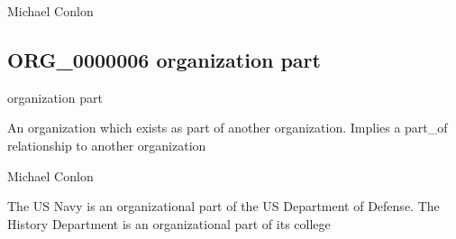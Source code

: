 \documentclass[letterpaper,10pt,english]{sphinxmanual}
\begin{document}
\begin{sphinxShadowBox}

\sphinxAtStartPar
Michael Conlon 
\end{sphinxShadowBox}
\begin{quote}

\ignorespaces \end{quote}


\subsection{ORG\_0000006 \sphinxhyphen{} organization part}
\label{\detokenize{doc-ORG_0000006:org-0000006-organization-part}}\label{\detokenize{doc-ORG_0000006:index-0}}\label{\detokenize{doc-ORG_0000006::doc}}
\begin{sphinxShadowBox}

\sphinxAtStartPar
organization part
\end{sphinxShadowBox}

\begin{sphinxShadowBox}

\sphinxAtStartPar
{\hyperref[\detokenize{doc-ORG_0000001::doc}]{}}
\end{sphinxShadowBox}

\begin{sphinxShadowBox}

\sphinxAtStartPar
An organization which exists as part of another organization.  Implies a part\_of relationship to another organization
\end{sphinxShadowBox}

\begin{sphinxShadowBox}

\sphinxAtStartPar
Michael Conlon 
\end{sphinxShadowBox}

\begin{sphinxShadowBox}

\sphinxAtStartPar
The US Navy is an organizational part of the US Department of Defense.  The History Department is an organizational part of its college
\end{sphinxShadowBox}
\end{document}
